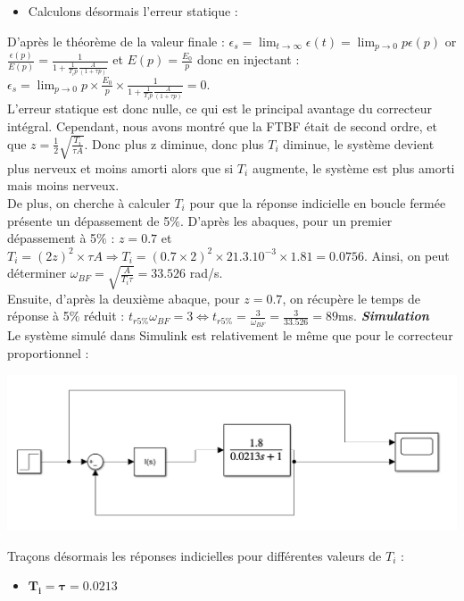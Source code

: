 \documentclass[12pt]{article}
\begin{document}
\begin{itemize}
    \item Calculons désormais l'erreur statique : 
\end{itemize}

D'après le théorème de la valeur finale : 
$\epsilon_s = \lim_{t \to \infty}\epsilon(t) = \lim_{p \to 0}p\epsilon(p)$ or $\frac{\epsilon(p)}{E(p)} = \frac{1}{1 + \frac{1}{T_ip}\frac{A}{(1+\tau p)}}$ et $E(p) = \frac{E_0}{p}$ donc en injectant :
$\epsilon_s = \lim_{p \to 0}p \times \frac{E_0}{p}\times \frac{1}{1 + \frac{1}{T_ip}\frac{A}{(1+\tau p)}} = 0$.
\\L'erreur statique est donc nulle, ce qui est le principal avantage du correcteur intégral. Cependant, nous avons montré que la FTBF était de second ordre, et que $z = \frac{1}{2}\sqrt{\frac{T_i}{\tau A}}$. Donc plus z diminue, donc plus $T_i$ diminue, le système devient plus nerveux et moins amorti alors que si $T_i$ augmente, le système est plus amorti mais moins nerveux.
\\De plus, on cherche à calculer $T_i$ pour que la réponse indicielle en boucle fermée présente un dépassement de 5$\%$.
D'après les abaques, pour un premier dépassement à 5$\%$ : $z=0.7$ et $T_i = (2z)^2\times\tau A \Rightarrow T_i = (0.7\times2)^2\times21.3.10^{-3}\times1.81 = 0.0756$.
Ainsi, on peut déterminer $\omega_{BF} = \sqrt{\frac{A}{T_i \tau}} = 33.526$ rad/s.
\\Ensuite, d'après la deuxième abaque, pour $z=0.7$, on récupère le temps de réponse à 5$\%$ réduit :
$t_{r5\%}\omega_{BF} = 3 \Leftrightarrow t_{r5\%} = \frac{3}{\omega_{BF}} = \frac{3}{33.526} = 89$ms.
\newpage
\Large \textit{ \textbf{Simulation}}
\\\normalsize Le système simulé dans Simulink est relativement le même que pour le correcteur proportionnel : 
\begin{center}
    \includegraphics[width = 15 cm]{TP2 Simulink/Syst_1/Syst1_Simulink_I.png}
\end{center}

Traçons désormais les réponses indicielles pour différentes valeurs de $T_i$ : 
\begin{itemize}
    \item \large $\mathbf{T_i = \tau = 0.0213}$
\end{itemize}
\end{document}
